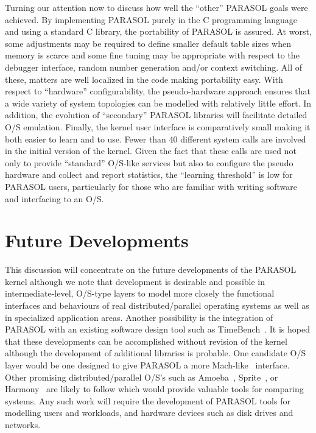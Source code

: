 \documentclass[11pt]{article}
\begin{document}
Turning our attention now to discuss how well the ``other'' PARASOL goals were achieved. By
implementing PARASOL purely in the C programming language and using a standard C library,
the portability of PARASOL is assured. At worst, some adjustments may be required to define
smaller default table sizes when memory is scarce and some fine tuning may be appropriate with
respect to the debugger interface, random number generation and/or context switching. All of
these, matters are well localized in the code making portability easy. With respect to ``hardware''
configurability, the pseudo-hardware approach ensures that a wide variety of system topologies
can be modelled with relatively little effort. In addition, the evolution of ``secondary'' PARASOL
libraries will facilitate detailed O/S emulation. Finally, the kernel user interface is comparatively
small making it both easier to learn and to use. Fewer than 40 different system calls are involved in
the initial version of the kernel. Given the fact that these calls are used not only to provide
``standard'' O/S-like services but also to configure the pseudo hardware and collect and report
statistics, the ``learning threshold'' is low for PARASOL users, particularly for those who are
familiar with writing software and interfacing to an O/S.

\section{Future Developments}
\label{sec:future }

This discussion will concentrate on the future developments of the PARASOL kernel although we
note that development is desirable and possible in intermediate-level, O/S-type layers to model
more closely the functional interfaces and behaviours of real distributed/parallel operating systems
as well as in specialized application areas. Another possibility is the integration of PARASOL with
an existing software design tool such as TimeBench~\cite{buhr-timebench}. It is hoped that these developments can
be accomplished without revision of the kernel although the development of additional libraries is
probable. One candidate O/S layer would be one designed to give PARASOL a more Mach-like~\cite{rashid-mach}
interface. Other promising distributed/parallel O/S's such as Amoeba~\cite{mullender-amoeba}, Sprite~\cite{ousterhout-sprite}, or
Harmony~\cite{gentleman-harmony} are likely to follow which would provide valuable tools for comparing systems. Any
such work will require the development of PARASOL tools for modelling users and workloads,
and hardware devices such as disk drives and networks.
\end{document}
